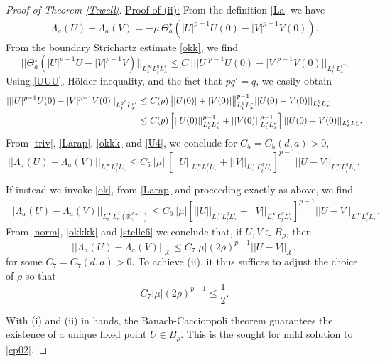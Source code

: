 \documentclass[10pt,a4paper]{amsart}
\def \RN {\mathbb{R}_+^{d+1}}
\newcommand{\Xs}{\mathcal X}
\begin{document}
\begin{proof}[Proof of Theorem \ref{T:well}]
\vskip 0.2in

\noindent \underline{Proof of (ii):} From the definition \eqref{La} we have
\begin{align}\label{Larap}
\Lambda_a(U) - \Lambda_a(V) = -\mu\, \Theta_a^\star\left(|U|^{p-1} U(0) - |V|^{p-1} V(0)\right).
\end{align}
From the boundary Strichartz estimate \eqref{okk}, we find
\begin{equation}\label{okkk}
||\Theta_a^\star\left(|U|^{p-1} U - |V|^{p-1} V\right)||_{L^\infty_{z} L^q_t L^r_x } \le C\ |||U|^{p-1} U(0) - |V|^{p-1} V(0)||_{L^{q'}_t L^{r'}_x}.
\end{equation}
Using \eqref{UUU}, H\"older inequality, and the fact that $pq' = q$, we easily obtain
\begin{align}\label{U4}
 || |U|^{p-1} U(0) - |V|^{p-1} V(0)||_{L^{q'}_t L^{r'}_x} & \le  C(p) \big\||U(0)| + |V(0)|\big\|^{p-1}_{L^q_t L^{r}_x}  ||U(0)-V(0)||_{L^q_t L^{r}_x}
 \\
& \le C(p) \left[||U(0)||^{p-1}_{L^q_t L^{r}_x}  + ||V(0)||^{p-1}_{L^q_t L^{r}_x}\right]  ||U(0)-V(0)||_{L^q_t L^{r}_x}.
\notag
\end{align}
From \eqref{triv}, \eqref{Larap}, \eqref{okkk} and \eqref{U4}, we conclude for $C_5 = C_5(d,a)>0$,
\begin{equation}\label{okkkk}
||\Lambda_a(U) - \Lambda_a(V)||_{L^\infty_{z} L^q_t L^r_x } \le C_5\ |\mu|\ \left[||U||_{L^\infty_z L^{q}_t L^{r}_x } + ||V||_{L^\infty_z L^{q}_t L^{r}_x}\right]^{p-1} ||U-V||_{L^\infty_z L^{q}_t L^{r}_x},
\end{equation}

If instead we invoke \eqref{ok}, from \eqref{Larap} and proceeding exactly as above, we find
\begin{align}\label{stelle6}
||\Lambda_a(U) - \Lambda_a(V)||_{L^\infty_t L^2_a(\RN)} \le C_6\ |\mu| \left[||U||_{ L^\infty_z L^{q}_t L^{r}_x} + ||V||_{ L^\infty_z L^{q}_t L^{r}_x}\right]^{p-1} ||U-V||_{ L^\infty_z L^{q}_t L^{r}_x}. 
\end{align}
From \eqref{norm}, \eqref{okkkk} and \eqref{stelle6} we conclude that, if $U, V\in B_\rho$, then
\[
||\Lambda_a(U) - \Lambda_a(V)||_{\Xs} \le C_7 |\mu| (2\rho)^{p-1} ||U - V||_{\Xs},
\]
for some $C_7 = C_7(d,a)>0$.
To achieve (ii), it thus suffices to adjust the choice of $\rho$ so that
\[
C_7 |\mu| (2\rho)^{p-1}\le \frac 12.
\]


With (i) and (ii) in hands, the Banach-Caccioppoli theorem guarantees the existence of a unique fixed point $U\in B_\rho$. This is the sought for mild solution to \eqref{cp02}.


\end{proof}
\end{document}
